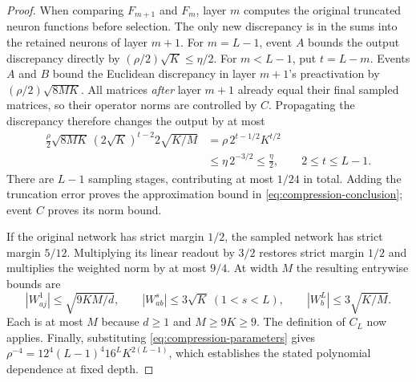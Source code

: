 \begin{proof}
When comparing $F_{m+1}$ and $F_m$, layer $m$ computes the original
truncated neuron functions before selection. The only new discrepancy
is in the sums into the retained neurons of layer $m+1$.
For $m=L-1$, event $A$ bounds the output discrepancy directly by
$(\rho/2)\sqrt K\leq\eta/2$. For $m<L-1$, put $t=L-m$.
Events $A$ and $B$ bound the Euclidean discrepancy in layer $m+1$'s
preactivation by $(\rho/2)\sqrt{8MK}$. All matrices \emph{after}
layer $m+1$ already equal their final sampled matrices, so their
operator norms are controlled by $C$. Propagating the discrepancy
therefore changes the output by at most
\begin{align*}
 \frac\rho2\sqrt{8MK}\,(2\sqrt K)^{t-2}
       2\sqrt{K/M}
 &=\rho\,2^{t-1/2}K^{t/2}\\
 &\leq\eta\,2^{-3/2}\leq\frac\eta2,
 \qquad 2\leq t\leq L-1.
\end{align*}
There are $L-1$ sampling stages, contributing at most $1/24$ in total.
Adding the truncation error proves the approximation bound in
\eqref{eq:compression-conclusion}; event $C$ proves its norm bound.

If the original network has strict margin $1/2$, the sampled network
has strict margin $5/12$. Multiplying its linear readout by $3/2$
restores strict margin $1/2$ and multiplies the weighted norm by at
most $9/4$. At width $M$ the resulting entrywise bounds are
\[
 |W^1_{aj}|\leq\sqrt{9KM/d},\qquad
 |W^s_{ab}|\leq3\sqrt K\ (1<s<L),\qquad
 |W^L_b|\leq3\sqrt{K/M}.
\]
Each is at most $M$ because $d\geq1$ and $M\geq9K\geq9$.
The definition of $C_L$ now applies. Finally, substituting
\eqref{eq:compression-parameters} gives
$\rho^{-4}=12^4(L-1)^4 16^L K^{2(L-1)}$, which establishes the stated
polynomial dependence at fixed depth.
\end{proof}
